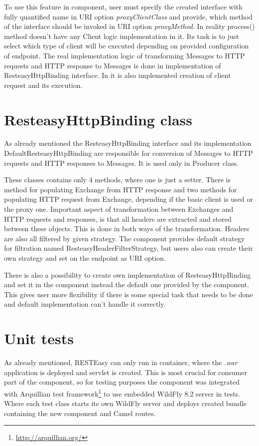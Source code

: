 \documentclass[12pt,final,oneside]{fithesis2}
\begin{document}
To use this feature in component, user must specify the created interface with fully quantified name in URI option \textit{proxyClientClass} and provide, which method of the interface should be invoked in URI option \textit{proxyMethod}. In reality process() method doesn't have any Client logic implementation in it. Its task is to just select which type of client will be executed depending on provided configuration of endpoint. The real implementation logic of transforming Messages to HTTP requests and HTTP response to Messages is done in implementation of ResteasyHttpBinding interface. In it is also implemented creation of client request and its execution.


\section{ResteasyHttpBinding class}
As already mentioned the ResteasyHttpBinding interface and its implementation DefaultResteasyHttpBinding are responsible for conversion of Messages to HTTP requests and HTTP responses to Messages. It is used only in Producer class. 

These classes contains only 4 methods, where one is just a setter. There is method for populating Exchange from HTTP response and two methods for populating HTTP request from Exchange, depending if the basic client is used or the proxy one. Important aspect of transformation between Exchanges and HTTP requests and responses, is that all headers are extracted and stored between these objects. This is done in both ways of the transformation. Headers are also all filtered by given strategy. The component provides default strategy for filtration named ResteasyHeaderFilterStrategy, but users also can create their own strategy and set on the endpoint as URI option.

There is also a possibility to create own implementation of ResteasyHttpBinding and set it in the component instead the default one provided by the component. This gives user more flexibility if there is some special task that needs to be done and default implementation can't handle it correctly.  

\section{Unit tests}
As already mentioned, RESTEasy can only run in container, where the \textit{.war} application is deployed and servlet is created. This is most crucial for consumer part of the component, so for testing purposes the component was integrated with Arquillian test framework\footnote{\url{http://arquillian.org/}} to use embedded WildFly 8.2 server in tests. Where each test class starts its own WildFly server and deploys created bundle containing the new component and Camel routes.  
\end{document}
